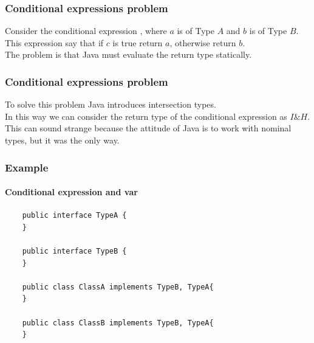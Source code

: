 \documentclass{beamer}
\begin{document}
\begin{frame}
\frametitle{Conditional expressions problem}
Consider the conditional expression , where $a$ is of Type $A$ and $b$ is of Type $B$.\\
This expression say that if $c$ is true return $a$, otherwise return $b$.\\ The problem is that Java must evaluate the return type statically.

\begin{center}
\end{center}
\end{frame}

\begin{frame}
\frametitle{Conditional expressions problem}
\boldmath
To solve this problem Java introduces intersection types.\\
In this way we can consider the return type of the conditional expression as $I\&H$.\\
This can sound strange because the attitude of Java is to work with nominal types, but it was the only way.
\end{frame}

\begin{frame}[fragile]
\frametitle{Example}
\framesubtitle{Conditional expression and var}
\boldmath
\begin{flushleft}
	\begin{lstlisting}
	public interface TypeA {
	}
	
	public interface TypeB {
	}
	
	public class ClassA implements TypeB, TypeA{
	}
	
	public class ClassB implements TypeB, TypeA{
	}
	\end{lstlisting}
\end{flushleft}
\end{frame}
\end{document}
